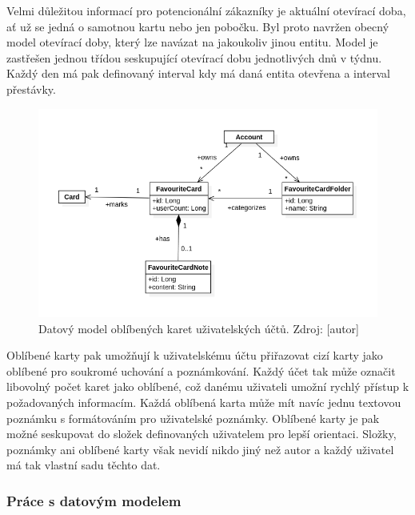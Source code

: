 		Velmi důležitou informací pro potencionální zákazníky je aktuální otevírací doba, ať už se jedná o samotnou kartu nebo
		jen pobočku.
		Byl proto navržen obecný model otevírací doby, který lze navázat na jakoukoliv jinou entitu.
		Model je zastřešen jednou třídou seskupující otevírací dobu jednotlivých dnů v týdnu.
		Každý den má pak definovaný interval kdy má daná entita otevřena a interval přestávky.

		\begin{figure}[H]
			\centering
			\includegraphics[width=\linewidth]{obrazky/datovy_model_oblibene_karty}\hfill
			\caption{Datový model oblíbených karet uživatelských účtů. Zdroj: [autor]}
		\end{figure}

		Oblíbené karty pak umožňují k uživatelskému účtu přiřazovat cizí karty jako oblíbené pro soukromé uchování a
		poznámkování.
		Každý účet tak může označit libovolný počet karet jako oblíbené, což danému uživateli umožní rychlý přístup
		k požadovaných informacím.
		Každá oblíbená karta může mít navíc jednu textovou poznámku s formátováním pro uživatelské poznámky.
		Oblíbené karty je pak možné seskupovat do složek definovaných uživatelem pro lepší orientaci.
		Složky, poznámky ani oblíbené karty však nevidí nikdo jiný než autor a každý uživatel má tak vlastní sadu těchto dat.

		\subsubsection{Práce s datovým modelem}

